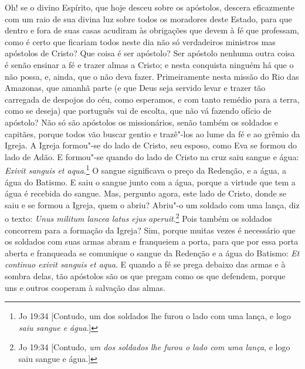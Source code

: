 Oh! se o divino Espírito, que hoje desceu sobre os apóstolos, descera
eficazmente com um raio de sua divina luz sobre todos os moradores deste
Estado, para que dentro e fora de suas casas acudiram às obrigações que
devem à fé que professam, como é certo que ficariam todos neste dia não
só verdadeiros ministros mas apóstolos de Cristo? Que coisa é ser
apóstolo? Ser apóstolo nenhuma outra coisa é senão ensinar a fé e trazer
almas a Cristo; e nesta conquista ninguém há que o não possa, e, ainda,
que o não deva fazer. Primeiramente nesta missão do Rio das Amazonas,
que amanhã parte (e que Deus seja servido levar e trazer tão
carregada de despojos do céu, como esperamos, e com tanto remédio para a
terra, como se deseja) que português vai de escolta, que não vá
fazendo ofício de apóstolo? Não só são apóstolos os missionários, senão
também os soldados e capitães, porque todos vão buscar gentio e
trazê"-los ao lume da fé e ao grêmio da Igreja. A Igreja formou"-se do
lado de Cristo, seu esposo, como Eva se formou do lado de Adão. E
formou"-se quando do lado de Cristo na cruz saiu sangue e água:
\emph{Exivit sanguis et aqua}.\footnote{Jo 19:34 [Contudo, um dos soldados lhe furou o lado com uma lança, e logo \emph{saiu sangue e água}.]} O sangue significava o preço
da Redenção, e a água, a água do Batismo. E saiu o sangue junto com a
água, porque a virtude que tem a água é recebida do sangue. Mas,
pergunto agora, este lado de Cristo, donde se saiu e se formou a Igreja,
quem o abriu? Abriu"-o um soldado com uma lança, diz o texto: \emph{Unus
militum lancea latus ejus aperuit}.\footnote{Jo 19:34 [Contudo, \emph{um dos soldados lhe furou o lado com uma lança}, e logo saiu sangue e água.]} Pois também os soldados
concorrem para a formação da Igreja? Sim, porque muitas vezes é
necessário que os soldados com suas armas abram e franqueiem a porta,
para que por essa porta aberta e franqueada se comunique o sangue da
Redenção e a água do Batismo: \emph{Et continuo exivit sanguis et aqua}.
E quando a fé se prega debaixo das armas e à sombra delas, tão apóstolos
são os que pregam como os que defendem, porque uns e outros cooperam à
salvação das almas.

